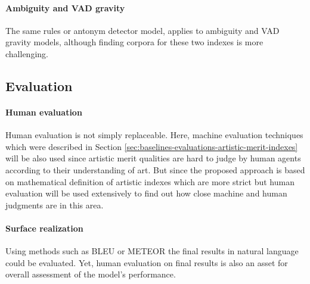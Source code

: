 \documentclass{article}
\begin{document}
	\paragraph{Ambiguity and VAD gravity} The same rules or antonym detector model, applies to ambiguity and VAD gravity models, although finding corpora for these two indexes is more challenging.  
	\subsection{Evaluation}
		\paragraph{Human evaluation} Human evaluation is not simply replaceable. Here, machine evaluation techniques which were described in Section \ref{sec:baselines-evaluations-artistic-merit-indexes} will be also used since artistic merit qualities are hard to judge by human agents according to their understanding of art. But since the proposed approach is based on mathematical definition of artistic indexes which are more strict but human evaluation will be used extensively to find out how close machine and human judgments are in this area. 
		\paragraph{Surface realization} Using methods such as BLEU \citep{papineni-2002-bleu-a-method-for-automatic-evaluation-of-machine-translation} or METEOR \citep{lavie-2007-proceedings-of-the-acl-workshop-on-intrinsic-and-extrinsic-evaluation-measures-for-machine-translation-and-or-summarization} the final results in natural language could be evaluated. Yet, human evaluation on final results is also an asset for overall assessment of the model's performance. %
	
\end{document}

